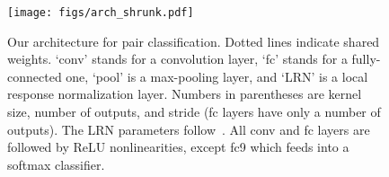 \documentclass[10pt,twocolumn,letterpaper]{article}
\begin{document}








\begin{figure}[t]
\begin{center}

   \texttt{[image: figs/arch\_shrunk.pdf]}
   \vspace{-.1in}
\end{center}
   \caption{Our architecture for pair classification.  Dotted lines indicate shared weights.  `conv' stands for a convolution layer, `fc' stands for a fully-connected one, `pool' is a max-pooling layer, and `LRN' is a local response normalization layer.  Numbers in parentheses are kernel size, number of outputs, and stride (fc layers have only a number of outputs).  The LRN parameters follow~\cite{krizhevsky2012imagenet}.  All conv and fc layers are followed by ReLU nonlinearities, except fc9 which feeds into a softmax classifier. }
   \vspace{-.2in}
\label{fig:arch}
\end{figure}
\end{document}
